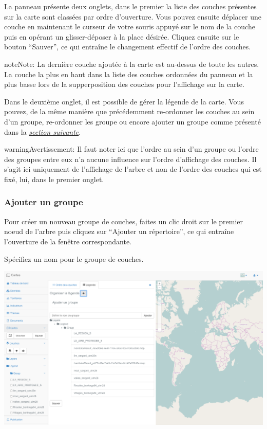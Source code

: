 \documentclass[letterpaper,10pt,french]{sphinxmanual}
\begin{document}
La panneau présente deux onglets, dans le premier la liste des couches
présentes sur la carte sont classées par ordre d'ouverture. Vous
pouvez ensuite déplacer une couche en maintenant le curseur de votre
souris appuyé sur le nom de la couche puis en opérant un
glisser-déposer à la place désirée. Cliquez ensuite sur le bouton
``Sauver'', ce qui entraîne le changement effectif de l'ordre des
couches.

\begin{notice}{note}{Note:}
La dernière couche ajoutée à la carte est au-dessus de toute
les autres. La couche la plus en haut dans la liste des
couches ordonnées du panneau et la plus basse lors de la
supperposition des couches pour l'affichage sur la carte.
\end{notice}

Dans le deuxième onglet, il est possible de gérer la légende de la
carte. Vous pouvez, de la même manière que précédemment re-ordonner
les couches au sein d'un groupe, re-ordonner les groupe ou encore
ajouter un groupe comme présenté dans la {\hyperref[maps/layerstree:maps-layerstree-order]{\emph{section suivante}}}.

\begin{notice}{warning}{Avertissement:}
Il faut noter ici que l'ordre au sein d'un groupe ou l'ordre des
groupes entre eux n'a aucune influence sur l'ordre d'affichage des
couches. Il s'agit ici uniquement de l'affichage de l'arbre et non
de l'ordre des couches qui est fixé, lui, dans le premier onglet.
\end{notice}


\subsubsection{Ajouter un groupe}
\label{maps/layerstree:ajouter-un-groupe}\label{maps/layerstree:maps-layerstree-order}
Pour créer un nouveau groupe de couches, faites un clic droit sur le premier noeud de l'arbre puis cliquez sur ``Ajouter un répertoire'', ce qui entraîne l'ouverture de la fenêtre correspondante.

Spécifiez un nom pour le groupe de couches.

\includegraphics[width=1.000\linewidth]{add-group-window.png}
\end{document}
